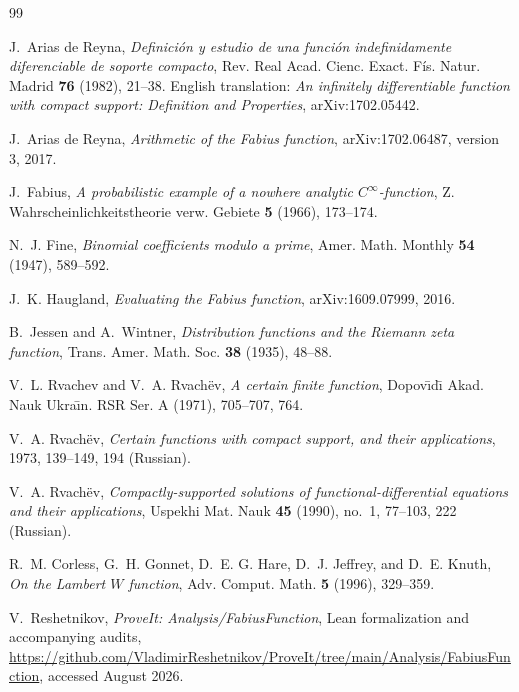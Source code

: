 \documentclass[11pt,oneside]{article}
\theoremstyle{definition}
\theoremstyle{remark}
\begin{document}
\clearpage
\begin{thebibliography}{99}

J.~Arias de Reyna,
\emph{Definici\'on y estudio de una funci\'on indefinidamente diferenciable de
soporte compacto},
Rev. Real Acad. Cienc. Exact. F\'is. Natur. Madrid \textbf{76} (1982), 21--38.
English translation: \emph{An infinitely differentiable function with compact
support: Definition and Properties}, arXiv:1702.05442.

J.~Arias de Reyna,
\emph{Arithmetic of the Fabius function},
arXiv:1702.06487, version 3, 2017.

J.~Fabius,
\emph{A probabilistic example of a nowhere analytic $C^\infty$-function},
Z. Wahrscheinlichkeitstheorie verw. Gebiete \textbf{5} (1966), 173--174.

N.~J. Fine,
\emph{Binomial coefficients modulo a prime},
Amer. Math. Monthly \textbf{54} (1947), 589--592.

J.~K. Haugland,
\emph{Evaluating the Fabius function},
arXiv:1609.07999, 2016.

B.~Jessen and A.~Wintner,
\emph{Distribution functions and the Riemann zeta function},
Trans. Amer. Math. Soc. \textbf{38} (1935), 48--88.

V.~L. Rvachev and V.~A. Rvach\"ev,
\emph{A certain finite function},
Dopov\={\i}d\={\i} Akad. Nauk Ukra\={\i}n. RSR Ser. A (1971), 705--707, 764.

V.~A. Rvach\"ev,
\emph{Certain functions with compact support, and their applications},
1973, 139--149, 194 (Russian).

V.~A. Rvach\"ev,
\emph{Compactly-supported solutions of functional-differential equations and
their applications},
Uspekhi Mat. Nauk \textbf{45} (1990), no.~1, 77--103, 222 (Russian).

R.~M. Corless, G.~H. Gonnet, D.~E. G. Hare, D.~J. Jeffrey, and D.~E. Knuth,
\emph{On the Lambert $W$ function},
Adv. Comput. Math. \textbf{5} (1996), 329--359.

V.~Reshetnikov,
\emph{ProveIt: Analysis/FabiusFunction},
Lean formalization and accompanying audits,
\url{https://github.com/VladimirReshetnikov/ProveIt/tree/main/Analysis/FabiusFunction},
accessed August 2026.

\end{thebibliography}
\end{document}
